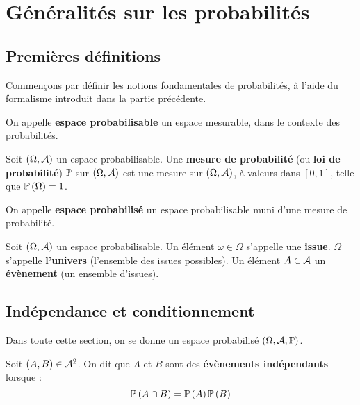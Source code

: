 \documentclass[../integ-proba.tex]{subfiles}
\begin{document}
    \chapter{Généralités sur les probabilités}

    \section{Premières définitions}

    Commençons par définir les notions fondamentales de probabilités, à l'aide du formalisme introduit dans la partie précédente.

    \begin{defi}
        On appelle \textbf{espace probabilisable} un espace mesurable, dans le contexte des probabilités.
    \end{defi}

    \begin{defi}
        Soit $\left(\Omega, \mathcal{A}\right)$ un espace probabilisable.
        Une \textbf{mesure de probabilité} (ou \textbf{loi de probabilité}) $\mathbb{P}$ sur $\left(\Omega, \mathcal{A}\right)$ est une mesure sur $\left(\Omega, \mathcal{A}\right)$, à valeurs dans $\left[0,1\right]$, telle que $\mathbb{P}\left(\Omega\right)=1$.
    \end{defi}

    \begin{defi}
        On appelle \textbf{espace probabilisé} un espace probabilisable muni d'une mesure de probabilité.
    \end{defi}

    \begin{defi}
        Soit $\left( \Omega, \mathcal{A} \right)$ un espace probabilisable.
        Un élément $\omega \in \Omega$ s'appelle une \textbf{issue}.
        $\Omega$ s'appelle \textbf{l'univers} (l'ensemble des issues possibles).
        Un élément $A \in \mathcal{A}$ un \textbf{évènement} (un ensemble d'issues).
    \end{defi}

    \section{Indépendance et conditionnement}
    \label{sec:indep_cond}

    Dans toute cette section, on se donne un espace probabilisé $\left( \Omega, \mathcal{A}, \mathbb{P} \right)$.

    \begin{defi}
        Soit $\left( A,B \right) \in \mathcal{A}^2$.
        On dit que $A$ et $B$ sont des \textbf{évènements indépendants} lorsque :
        \begin{displaymath}
            \mathbb{P}\left( A \cap B \right) = \mathbb{P}\left( A \right) \mathbb{P} \left( B \right)
        \end{displaymath}
    \end{defi}
\end{document}
